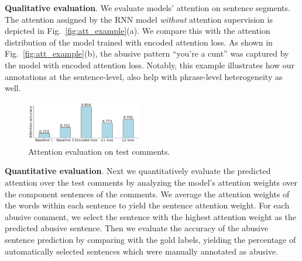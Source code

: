 \documentclass[letterpaper]{article} %
\begin{document}
\noindent\textbf{Qualitative evaluation}.
We evaluate models' attention on sentence segments.
The attention assigned by the RNN model \textit{without} attention supervision is depicted in Fig.~\ref{fig:att_example}(a). We compare this with the attention distribution of the model trained with encoded attention loss. As shown in Fig.~\ref{fig:att_example}(b), the abusive pattern ``you're a cunt'' was captured by the model with encoded attention loss. Notably, this example illustrates how  our annotations at the sentence-level, also help with phrase-level heterogeneity as well.
\begin{figure}[htbp!]
\captionsetup{font=normalsize}
\centering
\includegraphics[width=0.45\textwidth]{attn_eval_plot.png}
\caption{Attention evaluation on test comments.}
\label{fig:attn_eval_plot}
\end{figure}

\noindent\textbf{Quantitative evaluation}. Next we quantitatively evaluate the predicted attention over the test comments by analyzing the model's attention weights over the component sentences of the comments. We average the attention weights of the words within each sentence to yield the sentence attention weight. For each abusive comment, we select the sentence with the highest attention weight as the predicted abusive sentence. Then we evaluate the accuracy of the abusive sentence prediction by comparing with the gold labels, yielding the percentage of automatically selected sentences which were manually annotated as abusive.


\begin{table}[htbp!]
\captionsetup{font=normalsize}
\centering
{}
\caption{PR AUC of abuse categorization with and without attention supervision in single- and multi-task settings.}
\label{tab:categorization}
\end{table}
\end{document}
